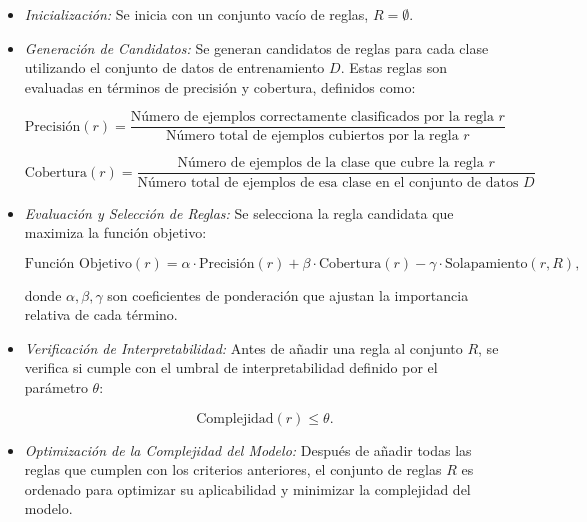 \begin{itemize}
    \item \textit{Inicialización:} Se inicia con un conjunto vacío de reglas, \( R = \emptyset \).
    
    \item \textit{Generación de Candidatos:} Se generan candidatos de reglas para cada clase utilizando el conjunto de datos de entrenamiento \( D \). Estas reglas son evaluadas en términos de precisión y cobertura, definidos como:

    \begin{equation}
    \text{Precisión}(r) = \frac{\text{Número de ejemplos correctamente clasificados por la regla } r}{\text{Número total de ejemplos cubiertos por la regla } r}
    \end{equation}
    
    \begin{equation}
    \text{Cobertura}(r) = \frac{\text{Número de ejemplos de la clase que cubre la regla } r}{\text{Número total de ejemplos de esa clase en el conjunto de datos } D}
    \end{equation}
    
    \item \textit{Evaluación y Selección de Reglas:} Se selecciona la regla candidata que maximiza la función objetivo:
    
    \begin{equation}
    \text{Función Objetivo}(r) = \alpha \cdot \text{Precisión}(r) + \beta \cdot \text{Cobertura}(r) - \gamma \cdot \text{Solapamiento}(r, R),
    \end{equation}
    
    donde \( \alpha, \beta, \gamma \) son coeficientes de ponderación que ajustan la importancia relativa de cada término.

    \item \textit{Verificación de Interpretabilidad:} Antes de añadir una regla al conjunto \( R \), se verifica si cumple con el umbral de interpretabilidad definido por el parámetro \( \theta \):
    
    \begin{equation}
    \text{Complejidad}(r) \leq \theta.
    \end{equation}
    
    \item \textit{Optimización de la Complejidad del Modelo:} Después de añadir todas las reglas que cumplen con los criterios anteriores, el conjunto de reglas \( R \) es ordenado para optimizar su aplicabilidad y minimizar la complejidad del modelo.
\end{itemize}

